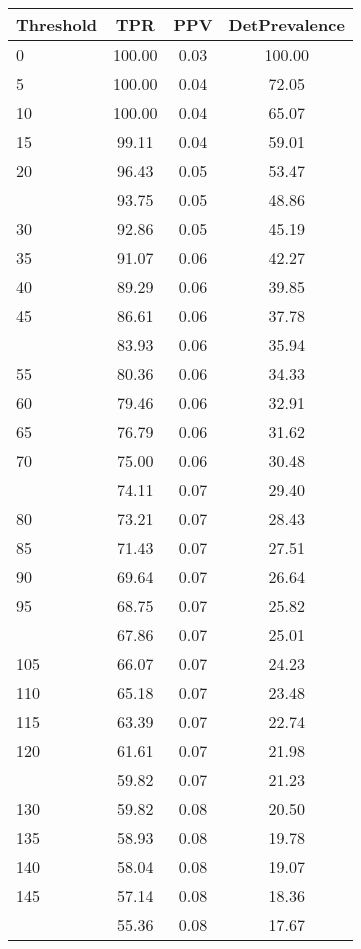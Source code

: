 \begin{table}[ht]
\centering
\begin{tabular}{lccc}
  \toprule
Threshold & TPR & PPV & DetPrevalence \\ 
  \midrule
0 & 100.00 & 0.03 & 100.00 \\ 
  5 & 100.00 & 0.04 & 72.05 \\ 
  10 & 100.00 & 0.04 & 65.07 \\ 
  15 & 99.11 & 0.04 & 59.01 \\ 
  20 & 96.43 & 0.05 & 53.47 \\ 
   \addlinespace
25 & 93.75 & 0.05 & 48.86 \\ 
  30 & 92.86 & 0.05 & 45.19 \\ 
  35 & 91.07 & 0.06 & 42.27 \\ 
  40 & 89.29 & 0.06 & 39.85 \\ 
  45 & 86.61 & 0.06 & 37.78 \\ 
   \addlinespace
50 & 83.93 & 0.06 & 35.94 \\ 
  55 & 80.36 & 0.06 & 34.33 \\ 
  60 & 79.46 & 0.06 & 32.91 \\ 
  65 & 76.79 & 0.06 & 31.62 \\ 
  70 & 75.00 & 0.06 & 30.48 \\ 
   \addlinespace
75 & 74.11 & 0.07 & 29.40 \\ 
  80 & 73.21 & 0.07 & 28.43 \\ 
  85 & 71.43 & 0.07 & 27.51 \\ 
  90 & 69.64 & 0.07 & 26.64 \\ 
  95 & 68.75 & 0.07 & 25.82 \\ 
   \addlinespace
100 & 67.86 & 0.07 & 25.01 \\ 
  105 & 66.07 & 0.07 & 24.23 \\ 
  110 & 65.18 & 0.07 & 23.48 \\ 
  115 & 63.39 & 0.07 & 22.74 \\ 
  120 & 61.61 & 0.07 & 21.98 \\ 
   \addlinespace
125 & 59.82 & 0.07 & 21.23 \\ 
  130 & 59.82 & 0.08 & 20.50 \\ 
  135 & 58.93 & 0.08 & 19.78 \\ 
  140 & 58.04 & 0.08 & 19.07 \\ 
  145 & 57.14 & 0.08 & 18.36 \\ 
   \addlinespace
150 & 55.36 & 0.08 & 17.67 \\ 

\end{tabular}
\end{table}
